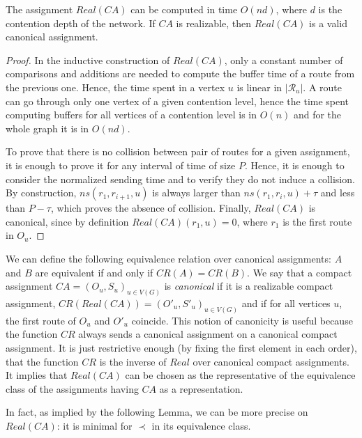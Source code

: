 \begin{lemma}\label{lemma:canonical}
The assignment $Real(CA)$ can be computed in time $O(nd)$, where $d$ is the contention
depth of the network. If $CA$ is realizable, then $Real(CA)$ is a valid canonical assignment.
\end{lemma}
\begin{proof}
In the inductive construction of $Real(CA)$,  only a constant number of comparisons and additions are needed to compute the 
buffer time of a route from the previous one. Hence, the time spent in a vertex $u$ is linear in $|\mathcal{R}_u|$. 
A route can go through only one vertex of a given contention level, hence the time spent computing buffers for all vertices
of a contention level is in $O(n)$ and for the whole graph it is in $O(nd)$.

To prove that there is no collision between pair of routes for a given assignment, it is enough to 
prove it for any interval of time of size $P$. Hence, it is enough to consider the normalized sending time and to verify
they do not induce a collision. By construction,  $ns(r_1,r_{i+1},u)$ is always larger than $ns(r_1,r_{i},u) + \tau$ and less 
than $P - \tau$, which proves the absence of collision. Finally, $Real(CA)$ is canonical, since by definition $Real(CA)(r_1,u) = 0$,
where $r_1$ is the first route in $O_u$.
\end{proof}

We can define the following equivalence relation over canonical assignments: $A$ and $B$ are equivalent if and only if $CR(A) = CR(B)$.
We say that a compact assignment $CA = (O_u,S_u)_{u \in V(G)}$ is \emph{canonical} if it is a realizable compact assignment, $CR(Real(CA)) = (O'_u,S'_u)_{u \in V(G)}$ and if for all vertices $u$, the first route of $O_u$ and $O'_u$ coincide. This notion of canonicity is useful because the function 
$CR$ always sends a canonical assignment on a canonical compact assignment. It is just restrictive enough (by fixing the first element in each order),
that the function $CR$ is the inverse of $Real$ over canonical compact assignments. It implies that
$Real(CA)$ can be chosen as the representative of the equivalence class of the assignments having $CA$ as a representation.

In fact, as implied by the following Lemma, we can be more precise on $Real(CA)$: it is minimal for $\prec$ in its equivalence class.

